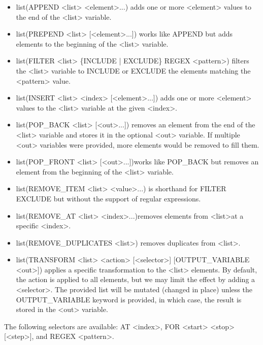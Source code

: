 \begin{itemize}
\item
list(APPEND <list> <element>...) adds one or more <element> values to the end of the <list> variable.

\item
list(PREPEND <list> [<element>...]) works like APPEND but adds elements to the beginning of the <list> variable.

\item
list(FILTER <list> \{INCLUDE | EXCLUDE\} REGEX <pattern>) filters the <list> variable to INCLUDE or EXCLUDE the elements matching the <pattern> value.

\item
list(INSERT <list> <index> [<element>...]) adds one or more <element> values to the <list> variable at the given <index>.

\item
list(POP\_BACK <list> [<out>...]) removes an element from the end of the <list> variable and stores it in the optional <out> variable. If multiple <out> variables were provided, more elements would be removed to fill them.

\item
list(POP\_FRONT <list> [<out>...])works like POP\_BACK but removes an element from the beginning of the <list> variable.

\item
list(REMOVE\_ITEM <list> <value>...) is shorthand for FILTER EXCLUDE but without the support of regular expressions.

\item
list(REMOVE\_AT <list> <index>...)removes elements from <list>at a specific <index>.

\item
list(REMOVE\_DUPLICATES <list>) removes duplicates from <list>.

\item
list(TRANSFORM <list> <action> [<selector>] [OUTPUT\_VARIABLE <out>]) applies a specific transformation to the <list> elements. By default, the action is applied to all elements, but we may limit the effect by adding a <selector>. The provided list will be mutated (changed in place) unless the OUTPUT\_VARIABLE keyword is provided, in which case, the result is stored in the <out> variable.
\end{itemize}

The following selectors are available: AT <index>, FOR <start> <stop> [<step>], and REGEX <pattern>.

